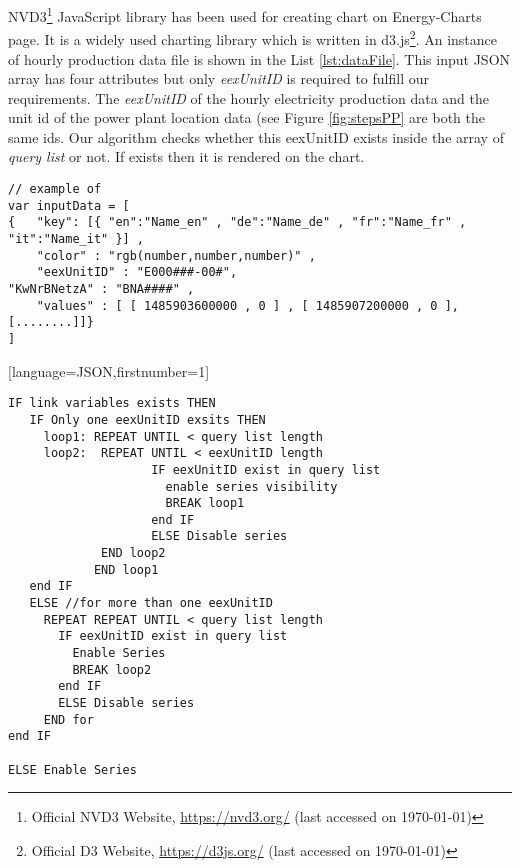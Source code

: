 NVD3\footnote{Official NVD3 Website, \url{https://nvd3.org/} (last accessed on \today)} JavaScript library has been used for creating chart on Energy-Charts page. It is a widely used charting library which is written in d3.js\footnote{Official D3 Website, \url{https://d3js.org/} (last accessed on \today)}. An instance of hourly production data file is shown in the List \ref{lst:dataFile}. This input JSON array has four attributes but only \textit{eexUnitID} is required to fulfill our requirements. The \textit{eexUnitID} of the hourly electricity production data and the unit id of the power plant location data (see Figure \ref{fig:stepsPP} are both the same ids. Our algorithm checks whether this eexUnitID exists inside the array of \textit{query list} or not. If exists then it is rendered on the chart. %

\begin{Listing} [H]
\begin{lstlisting}
// example of 
var inputData = [
{	"key": [{ "en":"Name_en" , "de":"Name_de" , "fr":"Name_fr" , "it":"Name_it" }] ,
	"color" : "rgb(number,number,number)" ,
	"eexUnitID" : "E000###-00#",
"KwNrBNetzA" : "BNA####" ,
	"values" : [ [ 1485903600000 , 0 ] , [ 1485907200000 , 0 ], [........]]}
]

\end{lstlisting}
\caption{Example of hourly production JSON data object}
\label{lst:dataFile}
\end{Listing}

[language=JSON,firstnumber=1]
\begin{Listing} [H]
\begin{lstlisting}
IF link variables exists THEN
   IF Only one eexUnitID exsits THEN
     loop1: REPEAT UNTIL < query list length
     loop2:  REPEAT UNTIL < eexUnitID length
					IF eexUnitID exist in query list
        	          enable series visibility 
                	  BREAK loop1
                	end IF
					ELSE Disable series
			 END loop2
		    END loop1
   end IF
   ELSE //for more than one eexUnitID
     REPEAT REPEAT UNTIL < query list length
       IF eexUnitID exist in query list
         Enable Series
         BREAK loop2
       end IF
       ELSE Disable series
     END for
end IF

ELSE Enable Series
\end{lstlisting}
\caption{JavaScript pseudo code for checking unit ids and enabling their visibility on the charts}
\label{lst:algo}
\end{Listing}

